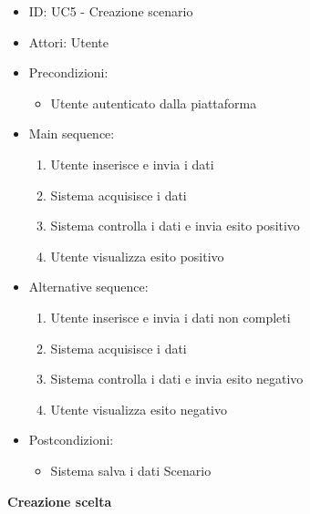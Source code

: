 \documentclass{article}
\begin{document}
\begin{itemize}[label = { }]
    \itemsep0px
    \item ID: UC5 - Creazione scenario
    \item Attori: Utente
    \item Precondizioni: 
        \begin{itemize}[label = {-}]
            \item Utente autenticato dalla piattaforma
        \end{itemize}
    \item Main sequence: 
        \begin{enumerate}
            \item Utente inserisce e invia i dati
            \item Sistema acquisisce i dati
            \item Sistema controlla i dati e invia esito positivo
            \item Utente visualizza esito positivo
        \end{enumerate}
    \item Alternative sequence:
        \begin{enumerate}
            \item Utente inserisce e invia i dati non completi
            \item Sistema acquisisce i dati
            \item Sistema controlla i dati e invia esito negativo
            \item Utente visualizza esito negativo
        \end{enumerate}
    \item Postcondizioni: 
        \begin{itemize}[label = {-}]
            \item Sistema salva i dati Scenario
        \end{itemize}
\end{itemize}
\textbf{Creazione scelta}
\end{document}
